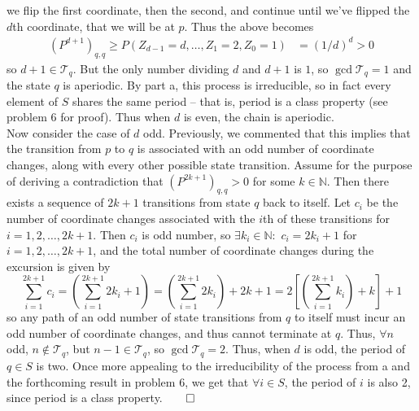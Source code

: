 \documentclass[11pt, letterpaper]{article}
\newcommand{\mbb}[1]{\mathbb{#1}}
\newcommand{\mc}[1]{\mathcal{#1}}
\begin{document}
    we flip the first coordinate, then the second, and continue until we've flipped the $d$th coordinate, that we will be at $p$. Thus the above becomes
    \begin{align*}
        (P^{d+1})_{q,q}\geq P(Z_{d-1}=d,\dots,Z_1=2,Z_0=1)&=(1/d)^d>0
    \end{align*}
    so $d+1\in\mc{T}_q$. But the only number dividing $d$ and $d+1$ is $1$, so $\gcd\mc{T}_q=1$ and the state $q$ is aperiodic. By part a, this process is irreducible, so in fact every
    element of $S$ shares the same period -- that is, period is a class property (see problem 6 for proof). Thus when $d$ is even, the chain is aperiodic.\\[10pt]
    Now consider the case of $d$ odd. Previously, we commented that this implies that the transition from $p$ to $q$ is associated with an odd number of coordinate changes, along with every other
    possible state transition.
    Assume for the purpose of deriving a contradiction that $(P^{2k+1})_{q,q}>0$ for some $k\in\mbb{N}$. Then there exists a sequence of $2k+1$ transitions from state $q$ back to itself. Let $c_i$ be the number of coordinate changes associated with the
    $i$th of these transitions for $i=1,2,\dots,2k+1$. Then $c_i$ is odd number, so $\exists k_i\in\mbb{N}:$ $c_i=2k_i+1$ for $i=1,2,\dots,2k+1$, and the total number of coordinate changes during the excursion is given by
    \[\sum_{i=1}^{2k+1}c_i=\left(\sum_{i=1}^{2k+1}2k_i+1\right)=\left(\sum_{i=1}^{2k+1}2k_i\right)+2k+1=2\left[\left(\sum_{i=1}^{2k+1}k_i\right)+k \right]+1\]
    so any path of an odd number of state transitions from $q$ to itself must incur an odd number of coordinate changes, and thus cannot terminate at $q$. Thus, $\forall n$ odd, $n\notin\mc{T}_q$, but $n-1\in\mc{T}_q$, so $\gcd\mc{T}_q=2$. Thus, when $d$ is odd, the period of $q\in S$ is two.
    Once more appealing to the irreducibility of the process from a and the forthcoming result in problem 6, we get that $\forall i\in S$, the period of $i$ is also 2, since period is a class property.\hfill{$\qed$}
\end{document}
